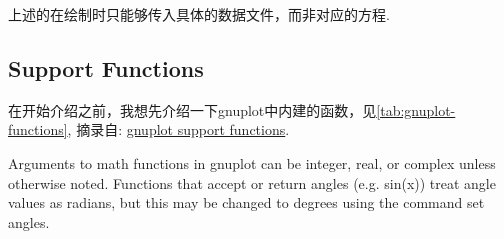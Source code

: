 \documentclass[
  hyper,    
  lang=cn,
  class=book,
  bib_index={load},
  mathSpec={envStyle=leftbar, alias},
  toc={column=2, title=目录},
]{zlatex}
\let\cmd\ztexverb
\begin{document}
\begin{remark}
上述的\cmd{\StairsPlot, \StemPlot, \BarPlot, \ShadePlot}在绘制时只能够传入具体的数据文件，而非对应的方程.
\end{remark}

\subsection{Support Functions}
在开始介绍之前，我想先介绍一下gnuplot中内建的函数，见\cref{tab:gnuplot-functions},
摘录自: \href{http://www.bersch.net/gnuplot-doc/expressions.html#expressions-functions-floor}{gnuplot support functions}.

\begin{leftbar}
    Arguments to math functions in gnuplot can be integer, real, or complex unless otherwise noted.
    Functions that accept or return angles (e.g. sin(x)) treat angle values as radians, but this may 
    be changed to degrees using the command set angles.
\end{leftbar}
\end{document}
